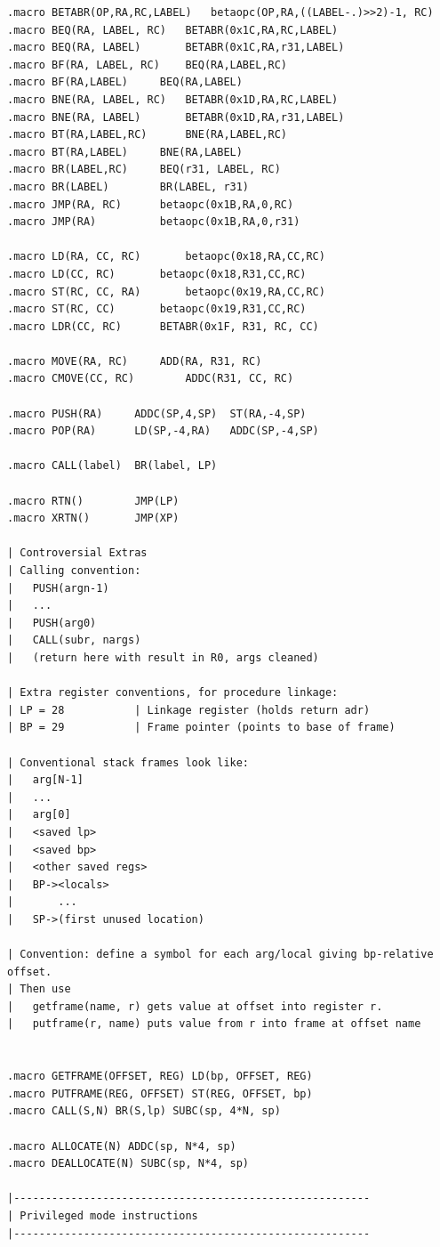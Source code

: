 \documentclass{article}
\begin{document}
\begin{lstlisting}
.macro BETABR(OP,RA,RC,LABEL)	betaopc(OP,RA,((LABEL-.)>>2)-1, RC)
.macro BEQ(RA, LABEL, RC)	BETABR(0x1C,RA,RC,LABEL)
.macro BEQ(RA, LABEL)		BETABR(0x1C,RA,r31,LABEL)
.macro BF(RA, LABEL, RC)	BEQ(RA,LABEL,RC)
.macro BF(RA,LABEL)		BEQ(RA,LABEL)
.macro BNE(RA, LABEL, RC)	BETABR(0x1D,RA,RC,LABEL)
.macro BNE(RA, LABEL)		BETABR(0x1D,RA,r31,LABEL)
.macro BT(RA,LABEL,RC)		BNE(RA,LABEL,RC)
.macro BT(RA,LABEL)		BNE(RA,LABEL)
.macro BR(LABEL,RC)		BEQ(r31, LABEL, RC)
.macro BR(LABEL)		BR(LABEL, r31)
.macro JMP(RA, RC)		betaopc(0x1B,RA,0,RC)
.macro JMP(RA)			betaopc(0x1B,RA,0,r31)

.macro LD(RA, CC, RC)		betaopc(0x18,RA,CC,RC)
.macro LD(CC, RC)		betaopc(0x18,R31,CC,RC)
.macro ST(RC, CC, RA)		betaopc(0x19,RA,CC,RC)
.macro ST(RC, CC)		betaopc(0x19,R31,CC,RC)
.macro LDR(CC, RC)		BETABR(0x1F, R31, RC, CC)

.macro MOVE(RA, RC)		ADD(RA, R31, RC)
.macro CMOVE(CC, RC)		ADDC(R31, CC, RC)

.macro PUSH(RA)		ADDC(SP,4,SP)  ST(RA,-4,SP)
.macro POP(RA)		LD(SP,-4,RA)   ADDC(SP,-4,SP)

.macro CALL(label)	BR(label, LP)
			
.macro RTN()		JMP(LP)
.macro XRTN()		JMP(XP)

| Controversial Extras
| Calling convention:
|	PUSH(argn-1)
|	...
|	PUSH(arg0)
|	CALL(subr, nargs)
|	(return here with result in R0, args cleaned)

| Extra register conventions, for procedure linkage:
| LP = 28			| Linkage register (holds return adr)
| BP = 29			| Frame pointer (points to base of frame)

| Conventional stack frames look like:
|	arg[N-1]
|	...
|	arg[0]
|	<saved lp>
|	<saved bp>
|	<other saved regs>
|   BP-><locals>
|       ...
|   SP->(first unused location)

| Convention: define a symbol for each arg/local giving bp-relative offset.
| Then use
|   getframe(name, r) gets value at offset into register r.
|   putframe(r, name) puts value from r into frame at offset name


.macro GETFRAME(OFFSET, REG) LD(bp, OFFSET, REG)
.macro PUTFRAME(REG, OFFSET) ST(REG, OFFSET, bp)
.macro CALL(S,N) BR(S,lp) SUBC(sp, 4*N, sp)

.macro ALLOCATE(N) ADDC(sp, N*4, sp)
.macro DEALLOCATE(N) SUBC(sp, N*4, sp)

|--------------------------------------------------------
| Privileged mode instructions
|--------------------------------------------------------


\end{lstlisting}
\end{document}
